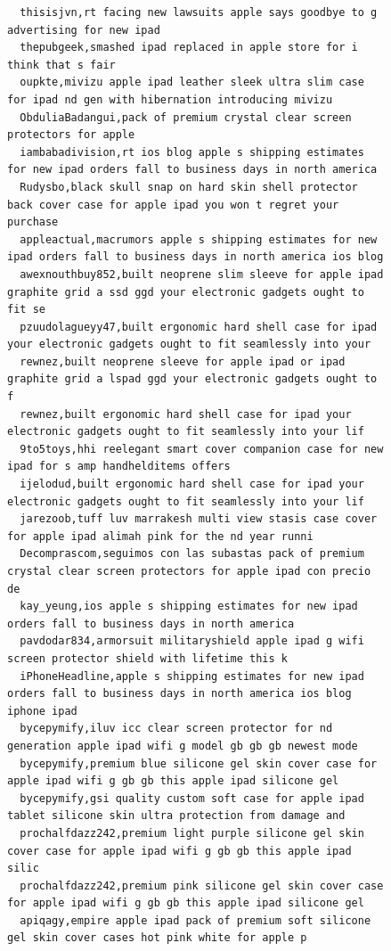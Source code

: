 \begin{figure}[htpb]
\begin{verbatim}
  thisisjvn,rt facing new lawsuits apple says goodbye to g advertising for new ipad
  thepubgeek,smashed ipad replaced in apple store for i think that s fair
  oupkte,mivizu apple ipad leather sleek ultra slim case for ipad nd gen with hibernation introducing mivizu
  ObduliaBadangui,pack of premium crystal clear screen protectors for apple
  iambabadivision,rt ios blog apple s shipping estimates for new ipad orders fall to business days in north america
  Rudysbo,black skull snap on hard skin shell protector back cover case for apple ipad you won t regret your purchase
  appleactual,macrumors apple s shipping estimates for new ipad orders fall to business days in north america ios blog
  awexnouthbuy852,built neoprene slim sleeve for apple ipad graphite grid a ssd ggd your electronic gadgets ought to fit se
  pzuudolagueyy47,built ergonomic hard shell case for ipad your electronic gadgets ought to fit seamlessly into your
  rewnez,built neoprene sleeve for apple ipad or ipad graphite grid a lspad ggd your electronic gadgets ought to f
  rewnez,built ergonomic hard shell case for ipad your electronic gadgets ought to fit seamlessly into your lif
  9to5toys,hhi reelegant smart cover companion case for new ipad for s amp handhelditems offers
  ijelodud,built ergonomic hard shell case for ipad your electronic gadgets ought to fit seamlessly into your lif
  jarezoob,tuff luv marrakesh multi view stasis case cover for apple ipad alimah pink for the nd year runni
  Decomprascom,seguimos con las subastas pack of premium crystal clear screen protectors for apple ipad con precio de
  kay_yeung,ios apple s shipping estimates for new ipad orders fall to business days in north america
  pavdodar834,armorsuit militaryshield apple ipad g wifi screen protector shield with lifetime this k
  iPhoneHeadline,apple s shipping estimates for new ipad orders fall to business days in north america ios blog iphone ipad
  bycepymify,iluv icc clear screen protector for nd generation apple ipad wifi g model gb gb gb newest mode
  bycepymify,premium blue silicone gel skin cover case for apple ipad wifi g gb gb this apple ipad silicone gel
  bycepymify,gsi quality custom soft case for apple ipad tablet silicone skin ultra protection from damage and
  prochalfdazz242,premium light purple silicone gel skin cover case for apple ipad wifi g gb gb this apple ipad silic
  prochalfdazz242,premium pink silicone gel skin cover case for apple ipad wifi g gb gb this apple ipad silicone gel
  apiqagy,empire apple ipad pack of premium soft silicone gel skin cover cases hot pink white for apple p

\end{verbatim}
\end{figure}
